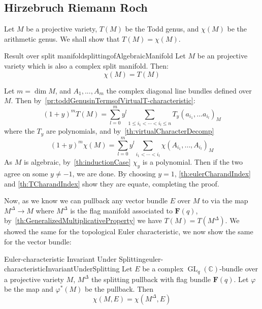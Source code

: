 \documentclass{ut-thesis}
\newenvironment{Proof}[1][]
  {\begin{ProofTcb}[#1]}
  {\end{ProofTcb}}
\newcommand{\C}{{\mathbb{C}}}
\renewcommand{\phi}{\varphi}
\renewcommand{\bf}[1]{\textbf{#1}}
\newcommand{\GL}{{\operatorname{GL}}}
\begin{document}
\subsection{Hirzebruch Riemann Roch}\label{sec:HRRlineBundle}


Let $M$ be a projective variety, $T(M)$ be the Todd genus, and $\chi(M)$ be the arithmetic genus. We shall
show that $T(M) = \chi(M)$.

\begin{thm}{Result over split manifold}{splittingofAlgebraicManifold}
  Let $M$ be an projective variety which is also a complex split manifold. Then:
  \[
    \chi(M) = T(M)
  \]
\end{thm}

\begin{Proof}
  Let $m = \dim M$, and $A_1, ..., A_m$ the complex diagonal line bundles defined over $M$. Then
  by~\cref{pr:toddGenusinTermsofVirtualT-characteristic}:
  \[
    (1+y)^m T(M) = \sum_{l=0}^my^l \sum_{1 \le i_1 < \cdots < i_l\le n} T_y(a_{i_1}, ... a_{i_l})_M
  \]
  where the $T_y$ are polynomials, and by~\cref{th:virtualCharacterDecomp}
  \[
  (1 + y)^m \chi(M) = \sum_{l=0}^m y^l \sum_{i_1 < \cdots < i_l} \chi(A_{i_1}, \ldots, A_{i_l})_M
  \]
  As $M$ is algebraic, by~\cref{th:inductionCase} $\chi_y$ is a polynomial. Then
  if the two agree on some $y\ne -1$, we are done. By
  choosing $y = 1$, \cref{th:eulerCharandIndex} and \cref{th:TCharandIndex}
  show they are equate, completing the proof.
\end{Proof}

Now, as we know we can pullback any vector bundle $E$ over $M$ to via the map $M^\Delta \to M$ where $M^\Delta$ is the
flag manifold associated to $\bf{F}(q)$, by~\cref{th:GeneralizedMultiplicativeProperty} we have $T(M)
=T(M^\Delta)$. We showed the same for the topological Euler characteristic, we now show the same for the
vector bundle:

\begin{thm}{Euler-characteristic Invariant Under Splitting}{euler-characteristicInvariantUnderSplitting}
  Let $E$ be a complex $\GL_q(\C)$-bundle over a projective variety $M$, $M^\Delta$ the splitting pullback
  with flag bundle $\bf{F}(q)$. Let
  $\phi$ be the map and $\phi^*(M)$ be the pullback. Then
  \[
    \chi(M, E) = \chi(M^\Delta, E)
  \]
\end{thm}
\end{document}
